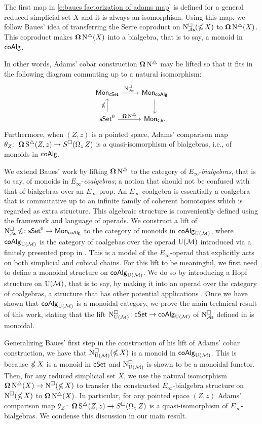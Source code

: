 The first map in \eqref{e:baues factorization of adams map} is defined for a general reduced simplicial set $X$ and it is always an isomorphism.
Using this map, we follow Baues' idea of transferring the Serre coproduct on $\operatorname{N^{\square}_{{\mathcal{A}\mathsf{s}}}}(\operatorname{\mathbb{\Omega}} X)$ to $\operatorname{\mathbf{\Omega}} \operatorname{N^{\triangle}}(X)$.
This coproduct makes $\operatorname{\mathbf{\Omega}} \operatorname{N^{\triangle}}(X)$ into a bialgebra, that is to say, a monoid in $\mathsf{coAlg}$.

In other words, Adams' cobar construction $\operatorname{\mathbf{\Omega}} \operatorname{N^{\triangle}}$ may be lifted so that it fits in the following diagram commuting up to a natural isomorphism:
\[
\begin{tikzcd}
\Mon_{\cSet} \arrow[r, "\cchainsAs \ "] & \Mon_{\coAlg} \arrow[d] \\
\sSet^0 \arrow[r, "\cobar \schains"] \arrow[u, "\ccobar"] & \Mon_{\Ch}.
\end{tikzcd}
\]
Furthermore, when $(Z, z)$ is a pointed space, Adams' comparison map $\theta_Z \colon \operatorname{\mathbf{\Omega}} \operatorname{S^{\triangle}}(Z, z) \to S^{\square}(\operatorname{\Omega}_z Z)$ is a quasi-isomorphism of bialgebras, i.e., of monoids in $\mathsf{coAlg}$.

We extend Baues' work by lifting $\operatorname{\mathbf{\Omega}} \operatorname{N^{\triangle}}$ to the category of $E_{\infty}$-\textit{bialgebras}, that is to say, of monoids in $E_{\infty}$-\textit{coalgebras}; a notion that should not be confused with that of bialgebras over an $E_{\infty}$-prop.
An $E_{\infty}$-coalgebra is essentially a coalgebra that is commutative up to an infinite family of coherent homotopies which is regarded as extra structure.
This algebraic structure is conveniently defined using the framework and language of operads.
We construct a lift of $\operatorname{N^{\square}_{{\mathcal{A}\mathsf{s}}}} \operatorname{\mathbb{\Omega}} \colon \mathsf{sSet}^0 \to \mathsf{Mon}_{\mathsf{coAlg}}$ to the category of monoids in $\mathsf{coAlg}_{\operatorname{U}(\mathcal{M})}$, where $\mathsf{coAlg}_{\operatorname{U}(\mathcal{M})}$ is the category of coalgebas over the operad ${\operatorname{U}(\mathcal{M})}$ introduced via a finitely presented prop in \cite{medina2020prop1}.
This is a model of the $E_\infty$-operad that explicitly acts on both simplicial and cubical chains.
For this lift to be meaningful, we first need to define a monoidal structure on $\mathsf{coAlg}_{\operatorname{U}(\mathcal{M})}$.
We do so by introducing a Hopf structure on ${\operatorname{U}(\mathcal{M})}$, that is to say, by making it into an operad over the category of coalgebras, a structure that has other potential applications \cite{livernet2008hopf}.
Once we have shown that $\mathsf{coAlg}_{\operatorname{U}(\mathcal{M})}$ is a monoidal category, we prove the main technical result of this work, stating that the lift $\operatorname{N^{\square}_{{\operatorname{U}(\mathcal{M})}}} \colon \mathsf{cSet} \to \mathsf{coAlg}_{\operatorname{U}(\mathcal{M})}$ of $\operatorname{N^{\square}_{{\mathcal{A}\mathsf{s}}}}$ defined in \cite{medina2021cubical} is monoidal.

Generalizing Baues' first step in the construction of his lift of Adams' cobar construction, we have that $\operatorname{N^{\square}_{{\operatorname{U}(\mathcal{M})}}}(\operatorname{\mathbb{\Omega}} X)$ is a monoid in $\mathsf{coAlg}_{\operatorname{U}(\mathcal{M})}$.
This is because $\operatorname{\mathbb{\Omega}} X$ is a monoid in $\mathsf{cSet}$ and $\operatorname{N^{\square}_{{\operatorname{U}(\mathcal{M})}}}$ is shown to be a monoidal functor.
Then, for any reduced simplicial set $X$, we use the natural isomorphism $\operatorname{\mathbf{\Omega}} \operatorname{N^{\triangle}}(X) \to \operatorname{N^{\square}}(\operatorname{\mathbb{\Omega}} X)$ to transfer the constructed $E_{\infty}$-bialgebra structure on $\operatorname{N^{\square}}(\operatorname{\mathbb{\Omega}} X)$ to $\operatorname{\mathbf{\Omega}} \operatorname{N^{\triangle}}(X)$.
In particular, for any pointed space $(Z, z)$ Adams' comparison map $\theta_Z \colon \operatorname{\mathbf{\Omega}} \operatorname{S^{\triangle}}(Z, z) \to S^{\square}(\operatorname{\Omega}_z Z)$ is a quasi-isomorphism of $E_{\infty}$-bialgebras.
We condense this discussion in our main result.

